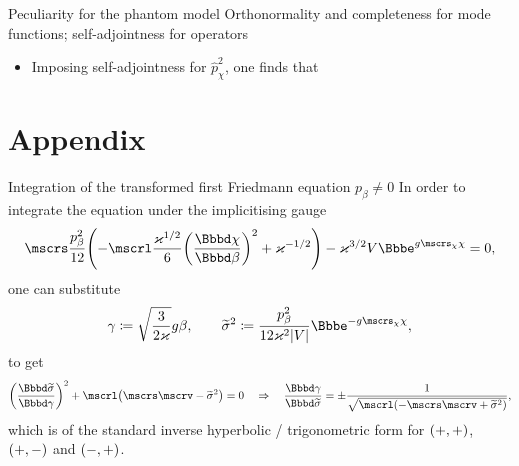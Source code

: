 \documentclass[9pt]{beamer}
\begin{document}
\begin{frame}%
{Peculiarity for the phantom model}%
{Orthonormality and completeness for mode functions; self-adjointness for 
operators}
\begin{itemize}

\item Imposing self-adjointness for $\widehat{p}_\chi^2$, one finds that
\end{itemize}
\end{frame}



\section*{Appendix}

\begin{frame}%
{Integration of the transformed first Friedmann equation}%
{$p_\beta \neq 0$}
In order to integrate the equation under the implicitising gauge
\begin{align}
\mscrs\frac{p_\beta^2}{12}\rbr{
-\mscrl\frac{\varkappa^{1/2}}{6}\rbr{\frde{\chi}{\beta}}^2
+\varkappa^{-1/2}}
-\varkappa^{3/2}V\ee^{g\mscrs_\chi\chi} = 0,
\end{align}
one can substitute
\begin{align}
\gamma \coloneqq \sqrt{\frac{3}{2\varkappa}}g\beta, \qquad
\widetilde{\sigma}^2 \coloneqq \frac{p_\beta^2}{12\varkappa^2 \vbr{V}}
\ee^{-g\mscrs_\chi\chi},
\end{align}
to get
\begin{align}
\rbr{\frde{\widetilde{\sigma}}{\gamma}}^2
+\mscrl\rbr{\mscrs\mscrv - \widetilde{\sigma}^2} = 0
\quad\Rightarrow\quad
\frde{\gamma}{\widetilde{\sigma}} = \pm
\frac{1}{\sqrt{\mscrl\rbr{- \mscrs\mscrv + \widetilde{\sigma}^2}}},
\end{align}
which is of the standard inverse hyperbolic / trigonometric form for
${\left(+,+\right)}$, ${\left(+,-\right)}$ and ${\left(-,+\right)}$.
\end{frame}
\end{document}
